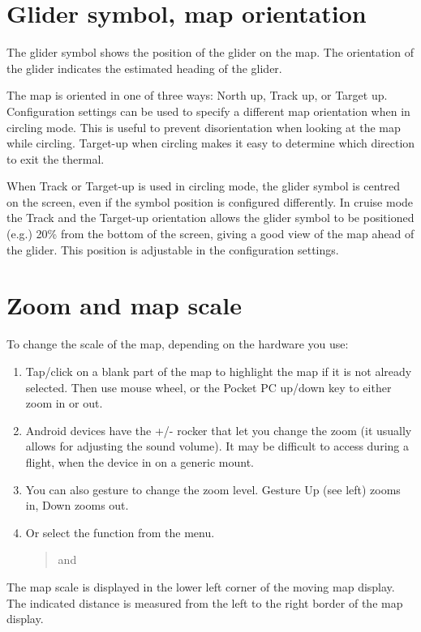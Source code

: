 \section{Glider symbol, map orientation}
The glider symbol shows the position of the glider on the map.  The
orientation of the glider indicates the estimated heading of the
glider.

The map is oriented in one of three ways: North up,
Track up, or Target up.  Configuration settings  can be used
to specify a different map orientation when in circling mode. This is useful to prevent
disorientation when looking at the map while circling.  Target-up when
circling makes it easy to determine which direction to exit the
thermal.

When Track or Target-up is used in circling mode, the glider symbol is
centred on the screen, even if the symbol position is configured differently.
In cruise mode the Track and the Target-up orientation allows the glider
symbol to be positioned (e.g.) 20\% from the bottom of the screen, giving a good view of the
map ahead of the glider.  This position is adjustable in the configuration
 settings.

\section{Zoom and map scale}\label{sec:zooming}

To change the scale of the map, depending on the hardware you use:
\begin{enumerate}
\item Tap/click on a blank part of the map to highlight the map if it is not
already selected.
Then use mouse wheel, or the Pocket PC up/down key to either zoom
in or out.
\item Android devices have the +/- rocker that let you change the zoom (it usually allows for adjusting the sound volume). It may be difficult to access during a flight, when the device in on a generic mount.
\item You can also gesture to change the zoom level. Gesture 
Up (see left) zooms in, Down zooms out.
\item Or select the function from the menu.
\begin{quote}
\blink{} and 
\end{quote}
\end{enumerate}

The map scale is displayed in the lower left corner of the moving map
display. The indicated distance is measured from the left to the right border
of the map display.

